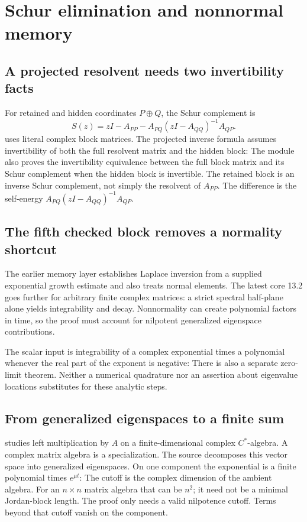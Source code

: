 \clearpage\section{Schur elimination and nonnormal memory}
\label{sec:memory}
\subsection{A projected resolvent needs two invertibility facts}
For retained and hidden coordinates $P\oplus Q$, the Schur complement is
\[
S(z)=zI-A_{PP}-A_{PQ}(zI-A_{QQ})^{-1}A_{QP}.
\]
 uses literal complex block matrices. The projected inverse formula assumes invertibility of both the full resolvent matrix and the hidden block:
The module also proves the invertibility equivalence between the full block matrix and its Schur complement when the hidden block is invertible. The retained block is an inverse Schur complement, not simply the resolvent of $A_{PP}$. The difference is the self-energy $A_{PQ}(zI-A_{QQ})^{-1}A_{QP}$.

\subsection{The fifth checked block removes a normality shortcut}
The earlier memory layer establishes Laplace inversion from a supplied exponential growth estimate and also treats normal elements. The latest core 13.2 goes further for arbitrary finite complex matrices: a strict spectral half-plane alone yields integrability and decay. Nonnormality can create polynomial factors in time, so the proof must account for nilpotent generalized eigenspace contributions.

The scalar input is integrability of a complex exponential times a polynomial whenever the real part of the exponent is negative:
There is also a separate zero-limit theorem. Neither a numerical quadrature nor an assertion about eigenvalue locations substitutes for these analytic steps.

\subsection{From generalized eigenspaces to a finite sum}
 studies left multiplication by $A$ on a finite-dimensional complex $C^*$-algebra. A complex matrix algebra is a specialization. The source decomposes this vector space into generalized eigenspaces. On one component the exponential is a finite polynomial times $e^{\mu t}$:
The cutoff is the complex dimension of the ambient algebra. For an $n\times n$ matrix algebra that can be $n^2$; it need not be a minimal Jordan-block length. The proof only needs a valid nilpotence cutoff. Terms beyond that cutoff vanish on the component.

